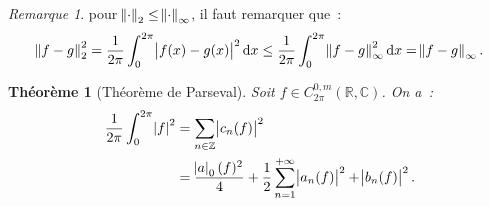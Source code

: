 \documentclass{report}
\newtheorem{thm}{Théorème}[chapter]
\theoremstyle{definition}
\theoremstyle{remark}
\newtheorem*{rmq}{Remarque}
\numberwithin{equation}{section}
\newcommand{\C}{\mathbb C}
\newcommand{\R}{\mathbb R}
\newcommand{\Z}{\mathbb Z}
\newcommand{\pinfty}{{+\infty}}
\newcommand{\CmT}[2]{C^{#1,m}_{#2}}
\newcommand{\CzmT}[1]{\CmT 0{#1}}
\newcommand{\Czm}{\CzmT{2\pi}}
\begin{document}
			\begin{rmq} pour $\norm \cdot_2 \leq \norm \cdot_\infty$, il faut remarquer que~:
			\begin{equation}
				\norm {f-g}_2^2 = \frac 1{2\pi}\int_0^{2\pi}\abs {f(x)-g(x)}^2\dif x \leq \frac 1{2\pi}\int_0^{2\pi}\norm {f-g}_\infty^2\dif x = \norm {f-g}_\infty.
			\end{equation}
			\end{rmq}

			\begin{thm}[Théorème de Parseval]\label{thm:Parseval} Soit $f \in \Czm(\R, \C)$. On a~:
			\begin{align}
				\frac 1{2\pi}\int_0^{2\pi}\abs f^2 &= \sum_{n \in \Z}\abs {c_n(f)}^2\label{eq:Parseval exp} \\
				&= \frac {\abs a_0(f)^2}4 + \frac 12\sum_{n=1}^\pinfty\abs {a_n(f)}^2 + \abs {b_n(f)}^2.
			\end{align}
			\end{thm}
\end{document}
